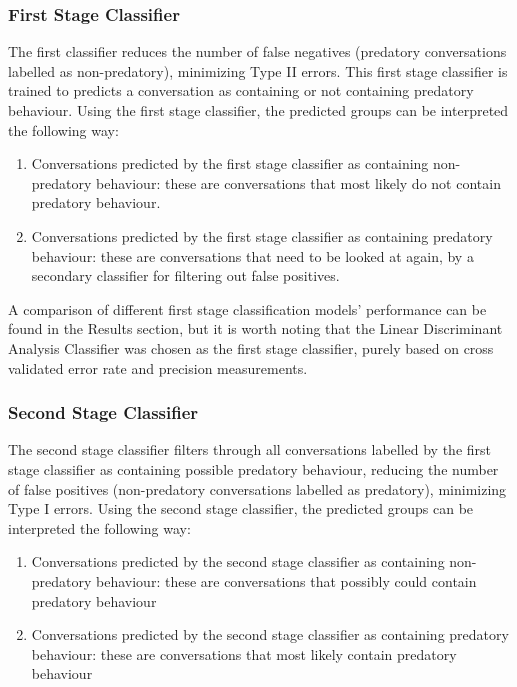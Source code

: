 \documentclass[11pt]{article}
\begin{document}
\subsubsection{First Stage Classifier}
The first classifier reduces the number of false negatives (predatory conversations labelled as non-predatory), minimizing Type II errors.
This first stage classifier is trained to predicts a conversation as containing or not containing predatory behaviour. Using the first stage classifier, the predicted groups can be interpreted the following way: 
\begin{enumerate}
    \item Conversations predicted by the first stage classifier as containing non-predatory behaviour: these are conversations that most likely do not contain predatory behaviour.
    \item Conversations predicted by the first stage classifier as containing predatory behaviour: these are conversations that need to be looked at again, by a secondary classifier for filtering out false positives.
\end{enumerate}

A comparison of different first stage classification models' performance can be found in the Results section, but it is worth noting that the Linear Discriminant Analysis Classifier was chosen as the first stage classifier, purely based on cross validated error rate and precision measurements.

\subsubsection{Second Stage Classifier}
The second stage classifier filters through all conversations labelled by the first stage classifier as containing possible predatory behaviour, reducing the number of false positives (non-predatory conversations labelled as predatory), minimizing Type I errors. Using the second stage classifier, the predicted groups can be interpreted the following way: 
\begin{enumerate}
    \item Conversations predicted by the second stage classifier as containing non-predatory behaviour: these are conversations that possibly could contain predatory behaviour
    \item Conversations predicted by the second stage classifier as containing predatory behaviour: these are conversations that most likely contain predatory behaviour
\end{enumerate}
\end{document}
